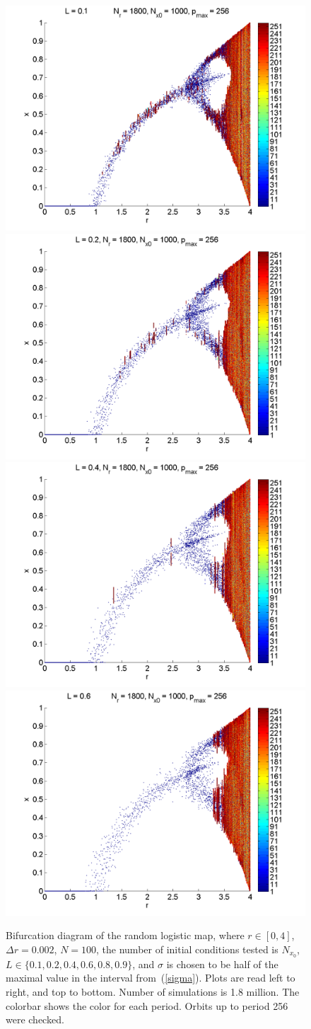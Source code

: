 \begin{figure}[H]\linespread{1}
\caption[Bifurcation diagram of the random logistic map, $\sigma=\frac{1}{2}\sigma_{max}$]{Bifurcation diagram of the random
logistic map, where $r \in [0,4]$, $\Delta r = 0.002$, $N=100$, the
number of initial conditions tested is $N_{x_0}$, $L\in
\{0.1,0.2,0.4,0.6,0.8,0.9\}$, and $\sigma$ is chosen to be half of the maximal
value in the interval from~(\ref{sigma}). Plots are read left to right, and top to
bottom. Number of simulations is 1.8 million. The colorbar shows the color for each period. Orbits up to period 256 were checked.}\label{fig:rlogbif_hs}
	\begin{center}
		\includegraphics[width=.5\textwidth]{figs/rlog_bif_halfs_L_01.png}\hfill
		\includegraphics[width=.5\textwidth]{figs/rlog_bif_halfs_L_02.png}\\
		\includegraphics[width=.5\textwidth]{figs/rlog_bif_halfs_L_04.png}\hfill
		\includegraphics[width=.5\textwidth]{figs/rlog_bif_halfs_L_06.png}\\

\end{center}
\end{figure}
